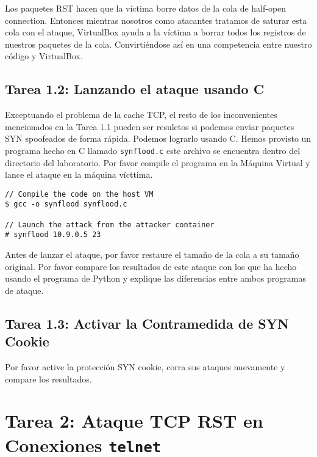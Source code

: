 Los paquetes RST hacen que la víctima borre datos de la cola de half-open connection. Entonces mientras nosotros como atacantes tratamos de saturar esta cola con el ataque, VirtualBox ayuda a la víctima a borrar todos los registros de nuestros paquetes de la cola. Convirtiéndose así en una competencia entre nuestro código y VirtualBox.



\subsection{Tarea 1.2: Lanzando el ataque usando C} 

Exceptuando el problema de la cache TCP, el resto de los inconvenientes mencionados en la Tarea 1.1 pueden ser resuletos si podemos enviar paquetes SYN spoofeados de forma rápida. Podemos lograrlo usando C. Hemos provisto un programa hecho en C llamado \texttt{synflood.c} este archivo se encuentra dentro del directorio del laboratorio. Por favor compile el programa en la Máquina Virtual y lance el ataque en la máquina vícttima.

\begin{lstlisting}
// Compile the code on the host VM
$ gcc -o synflood synflood.c

// Launch the attack from the attacker container
# synflood 10.9.0.5 23
\end{lstlisting}

Antes de lanzar el ataque, por favor restaure el tamaño de la cola a su tamaño original. Por favor compare los resultados de este ataque con los que ha hecho usando el programa de Python y explique las diferencias entre ambos programas de ataque.  


\subsection{Tarea 1.3: Activar la Contramedida de SYN Cookie}

Por favor active la protección SYN cookie, corra sus ataques nuevamente y compare los resultados. 


\section {Tarea 2: Ataque TCP RST en Conexiones \texttt{telnet}}

